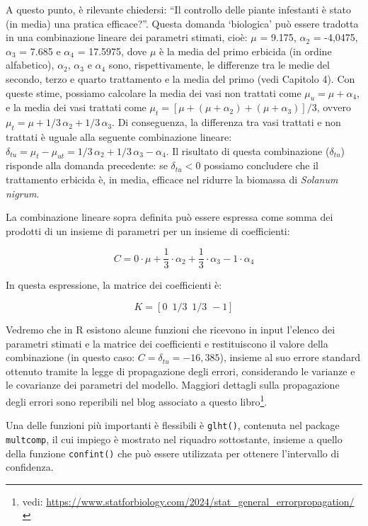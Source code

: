 \documentclass[
  12pt,
]{book}
\begin{document}
A questo punto, è rilevante chiedersi: ``Il controllo delle piante infestanti è stato (in media) una pratica efficace?''. Questa domanda `biologica' può essere tradotta in una combinazione lineare dei parametri stimati, cioè: \(\mu\) = 9.175, \(\alpha_2\) = -4,0475, \(\alpha_3\) = 7.685 e \(\alpha_4\) = 17.5975, dove \(\mu\) è la media del primo erbicida (in ordine alfabetico), \(\alpha_2\), \(\alpha_3\) e \(\alpha_4\) sono, rispettivamente, le differenze tra le medie del secondo, terzo e quarto trattamento e la media del primo (vedi Capitolo 4). Con queste stime, possiamo calcolare la media dei vasi non trattati come \(\mu_u = \mu + \alpha_4\), e la media dei vasi trattati come \(\mu_t = [\mu + (\mu + \alpha_2) + (\mu + \alpha_3)]/3\), ovvero \(\mu_t = \mu + 1/3 \, \alpha_2 + 1/3 \, \alpha_3\). Di conseguenza, la differenza tra vasi trattati e non trattati è uguale alla seguente combinazione lineare: \(\delta_{tu} = \mu_t - \mu_{ut} = 1/3 \, \alpha_2 + 1/3 \, \alpha_3 - \alpha_4\). Il risultato di questa combinazione (\(\delta_{tu}\)) risponde alla domanda precedente: se \(\delta_{tu} < 0\) possiamo concludere che il trattamento erbicida è, in media, efficace nel ridurre la biomassa di \emph{Solanum nigrum}.

La combinazione lineare sopra definita può essere espressa come somma dei prodotti di un insieme di parametri per un insieme di coefficienti:

\[C = 0 \cdot \mu + \frac{1}{3} \cdot \alpha_2 + \frac{1}{3} \cdot \alpha_3 - 1 \cdot \alpha_4\]

In questa espressione, la matrice dei coefficienti è:

\[K = \left[0 \,\,\, 1/3 \,\,\, 1/3 \,\, -1 \right]\]

Vedremo che in R esistono alcune funzioni che ricevono in input l'elenco dei parametri stimati e la matrice dei coefficienti e restituiscono il valore della combinazione (in questo caso: \(C = \delta_{tu} = -16,385\)), insieme al suo errore standard ottenuto tramite la legge di propagazione degli errori, considerando le varianze e le covarianze dei parametri del modello. Maggiori dettagli sulla propagazione degli errori sono reperibili nel blog associato a questo libro\footnote{vedi: \url{https://www.statforbiology.com/2024/stat_general_errorpropagation/}}.

Una delle funzioni più importanti è flessibili è \texttt{glht()}, contenuta nel package \texttt{multcomp}, il cui impiego è mostrato nel riquadro sottostante, insieme a quello della funzione \texttt{confint()} che può essere utilizzata per ottenere l'intervallo di confidenza.
\end{document}
